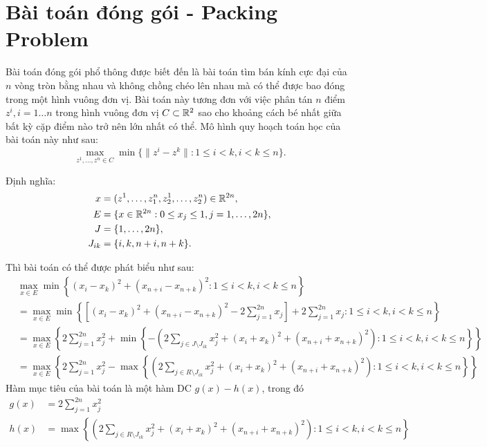 \documentclass[a4paper]{report}
\begin{document}
    \section{Bài toán đóng gói - Packing Problem}

    Bài toán đóng gói phổ thông được biết đến là bài toán tìm bán kính cực đại của $n$ vòng tròn bằng nhau và không chồng chéo lên nhau mà có thể được bao đóng trong một hình vuông đơn vị. Bài toán này tương đơn với việc phân tán $n$ điểm $z^i, i = 1\dots n$ trong hình vuông đơn vị $C \subset \mathbb{R}^2$ sao cho khoảng cách bé nhất giữa bất kỳ cặp điểm nào trở nên lớn nhất có thể. Mô hình quy hoạch toán học của bài toán này như sau:
    \begin{equation}
        \label{eq:packing}
        \max_{z^1, \dots, z^n \in C}\min\{\| z^i - z^k\|: 1 \leq i < k, i < k \leq n\}.
    \end{equation}

    Định nghĩa:
    \begin{align}
        x &= (z^1, \dots, z^n_1, z_2^1, \dots, z_2^n) \in \mathbb{R}^{2n},\\ 
        E &= \{x \in \mathbb{R}^{2n}: 0 \leq x_j \leq 1, j = 1, \dots, 2n\}, \\
        J &= \{1, \dots, 2n\},\\
        J_{ik} &= \{i, k, n + i, n + k\}.
    \end{align}

    Thì bài toán  có thể được phát biểu như sau:
    \begin{align}
        \label{eq:packing_opt_problem}
        &\max_{x \in E}\min\left\{(x_i - x_k)^2 + (x_{n+i} - x_{n+k})^2: 1 \leq i < k, i < k \leq n\right\} \\
        &= \max_{x \in E}\min\left\{\left[(x_i - x_k)^2 + (x_{n+i} - x_{n+k})^2 - 2\sum_{j = 1}^{2n}x_j\right] + 2\sum_{j=1}^{2n}x_j : 1 \leq i < k, i < k \leq n\right\} \\ 
        &=\max_{x \in E}\left\{2\sum_{j=1}^{2n}x_j^2 + \min\left\{-\left(2\sum_{j \in J \setminus J_{ik}}x^2_j + (x_i + x_k)^2 + (x_{n+i} + x_{n + k})^2\right): 1 \leq i < k, i < k \leq n\right\} \right\}\\ 
        &=\max_{x \in E}\left\{
            2\sum_{j=1}^{2n}x_j^2 - \max\left\{
                \left(
                    2\sum_{j \in R \setminus J_{ik}}x_j^2 + (x_i + x_k)^2 + (x_{n+i} + x_{n+k})^2
                \right): 1 \leq i < k, i < k \leq n
            \right\}
        \right\}
    \end{align}
    Hàm mục tiêu của bài toán là một hàm DC $g(x) - h(x)$, trong đó 
    \begin{align}
        \label{eq:objective_function_packing}
        g(x) &= 2\sum_{j=1}^{2n}x_j^2\\
        h(x) &=  \max\left\{
                \left(
                    2\sum_{j \in R \setminus J_{ik}}x_j^2 + (x_i + x_k)^2 + (x_{n+i} + x_{n+k})^2
                \right): 1 \leq i < k, i < k \leq n
            \right\}
    \end{align}
\end{document}
